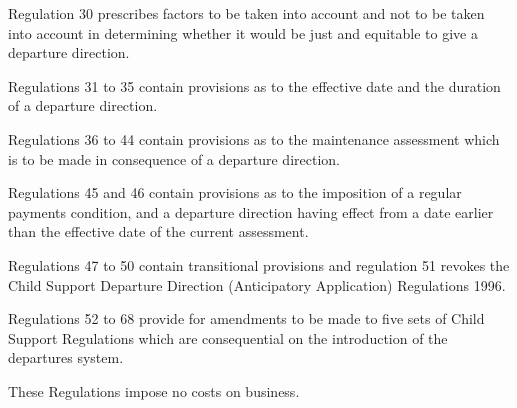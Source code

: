 \documentclass[a4paper]{article}
\begin{document}
Regulation 30 prescribes factors to be taken into account and not to be taken
into account in determining whether it would be just and equitable to give a
departure direction.

Regulations 31 to 35 contain provisions as to the effective date and the
duration of a departure direction.

Regulations 36 to 44 contain provisions as to the maintenance assessment which
is to be made in consequence of a departure direction.

Regulations 45 and 46 contain provisions as to the imposition of a regular
payments condition, and a departure direction having effect from a date earlier
than the effective date of the current assessment.

Regulations 47 to 50 contain transitional provisions and regulation 51 revokes
the Child Support Departure Direction (Anticipatory Application) Regulations
1996.

Regulations 52 to 68 provide for amendments to be made to five sets of Child
Support Regulations which are consequential on the introduction of the
departures system.

  These Regulations impose no costs on business.
\end{document}
